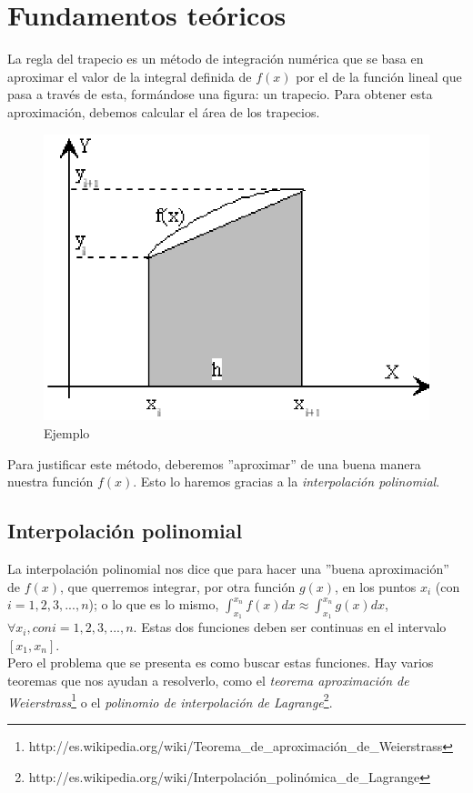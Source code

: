 \documentclass{article}
\begin{document}

  \section{Fundamentos teóricos}
    La regla del trapecio es un método de integración numérica que se basa en aproximar el valor de la integral definida de $f(x)$ por el de la función lineal que pasa a través de esta, formándose una figura: un trapecio. Para obtener esta aproximación, debemos calcular el área de los trapecios.
    
    \begin{figure}[h]
      \begin{center}
	\includegraphics[scale=0.5]{areadeltrapecio.eps}
	\caption{Ejemplo}
      \end{center}
    \end{figure}

      Para justificar este método, deberemos ''aproximar'' de una buena manera nuestra función $f(x)$. Esto lo haremos gracias a la \textit{interpolación polinomial}.

    \subsection{Interpolación polinomial}
      La interpolación polinomial nos dice que para hacer una ''buena aproximación'' de $f(x)$, que querremos integrar, por otra función $g(x)$, en los puntos $x_{i}$ (con $i = 1, 2, 3, ..., n$); o lo que es lo mismo, $\int_{x_{1}}^{x_{n}}f(x)dx \approx \int_{x_{1}}^{x_{n}}g(x)dx$, $\forall x_{i}, con i = 1, 2, 3, ..., n$. Estas dos funciones deben ser continuas en el intervalo $[x_{1}, x_{n}]$.\\
      Pero el problema que se presenta es como buscar estas funciones. Hay varios teoremas que nos ayudan a resolverlo, como el \textit{teorema aproximación de Weierstrass}\footnote{http://es.wikipedia.org/wiki/Teorema\_de\_aproximación\_de\_Weierstrass} o el \textit{polinomio de interpolación de Lagrange}\footnote{http://es.wikipedia.org/wiki/Interpolación\_polinómica\_de\_Lagrange}.
      
\end{document}
